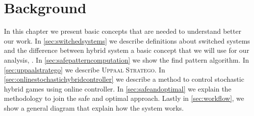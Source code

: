 \chapter{Background}
\label{ch:background}
In this chapter we present basic concepts that are needed 
to understand better our work. In \autoref{sec:switchedsystems} 
we describe definitions about switched systems and the 
difference between hybrid system a basic concept that we 
will use for our analysis, \cite{sanfelice2020hybrid}. 
In \autoref{sec:safepatterncomputation} we show the
find pattern algorithm. In \autoref{sec:uppaalstratego} we describe 
\textsc{Uppaal Stratego}. In \autoref{sec:onlinestochastichybridcontroller}
 we describe a method to control stochastic hybrid games using online 
 controller. In \autoref{sec:safeandoptimal} we explain the 
 methodology to join the safe and optimal approach. Lastly in 
\autoref{sec:workflow}, we show a general diagram that explain 
how the system works.
\clearpage

